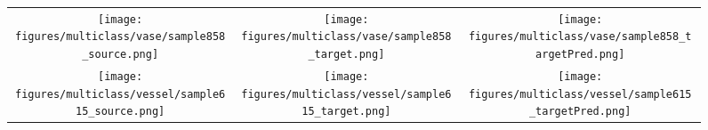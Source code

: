 \documentclass[acmtog,timestamp]{acmart}%
\begin{document}
\begin{figure}[h!]
\begin{tabular}{c c c}

\texttt{[image: figures/multiclass/vase/sample858\_source.png]} &
\texttt{[image: figures/multiclass/vase/sample858\_target.png]} &
\texttt{[image: figures/multiclass/vase/sample858\_targetPred.png]} \\


\texttt{[image: figures/multiclass/vessel/sample615\_source.png]} &
\texttt{[image: figures/multiclass/vessel/sample615\_target.png]} &
\texttt{[image: figures/multiclass/vessel/sample615\_targetPred.png]} \\


\end{tabular}    
\caption{}
\label{fig:multiclass}
\end{figure}\begin{comment}

vessel:
/home/rana/dan3_local/localdata/silhouettes/rendered/vessel/checkpoint/cagenet_2_12ctrls_silhouette,batchSize=200,cage_reg=1e-05,evalOnly=t,learn_beta=t,mpgPart=t,mpgSRng=1.1..1.8/FriJan1219:07:512018/qual

vase:
/home/rana/dan3_local/localdata/silhouettes/rendered/vase/checkpoint/cagenet_2_12ctrls_silhouette,batchSize=200,cage_reg=1e-05,evalOnly=t,learn_beta=t,mpgPart=t/FriJan1217:51:062018/qual

airplane:
/home/rana/dan3_local/localdata/silhouettes/rendered/airplane/checkpoint/cagenet_2_12ctrls_silhouette,batchSize=200,cage_reg=1e-05,evalOnly=t,learn_beta=t,mpgPart=t,mpgSRng=1.1..1.8/FriJan1219:17:392018/qual

\end{comment}\begin{figure*}[h]
\newcommand{\tfig}{1.9}
\setlength\tabcolsep{1pt}
\begin{tabular}{c c c c c c c c}




\end{tabular}
\end{figure*}
\end{document}
